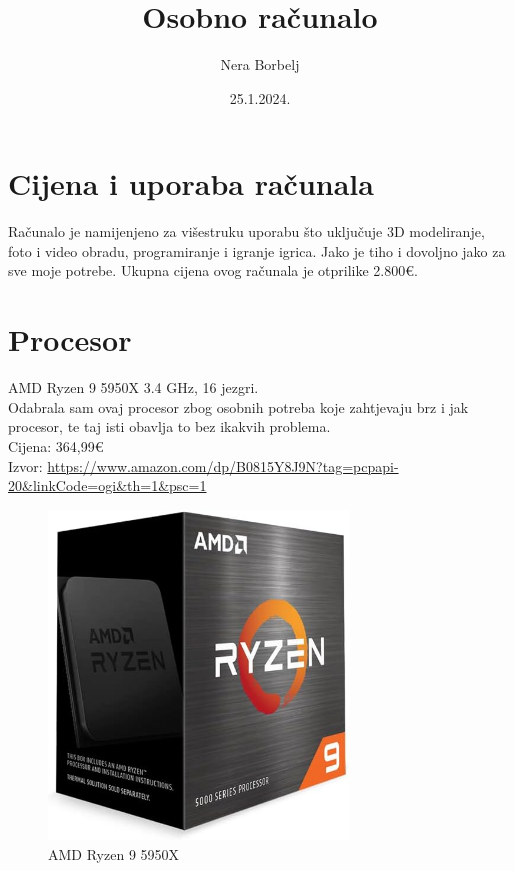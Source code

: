 \documentclass{report}
\begin{document}
\title{Osobno računalo}
\author{Nera Borbelj}
\date{25.1.2024.}
\maketitle
\tableofcontents
\listoffigures

\chapter{Cijena i uporaba računala}
Računalo je namijenjeno za višestruku uporabu što uključuje 3D modeliranje, foto i video obradu, programiranje i igranje igrica. Jako je tiho i dovoljno jako za sve moje potrebe. Ukupna cijena ovog računala je otprilike 2.800€.
 
\chapter{Procesor}
AMD Ryzen 9 5950X 3.4 GHz, 16 jezgri.
\\ Odabrala sam ovaj procesor zbog osobnih potreba koje zahtjevaju brz i jak procesor, te taj isti obavlja to bez ikakvih problema.
\\Cijena: 364,99€
\\Izvor:  \url{https://www.amazon.com/dp/B0815Y8J9N?tag=pcpapi-20&linkCode=ogi&th=1&psc=1}
\begin{figure}[h]
\includegraphics[width=8cm]{slike/procesor.jpg}
\caption{AMD Ryzen 9 5950X}
\end{figure}
\end{document}
